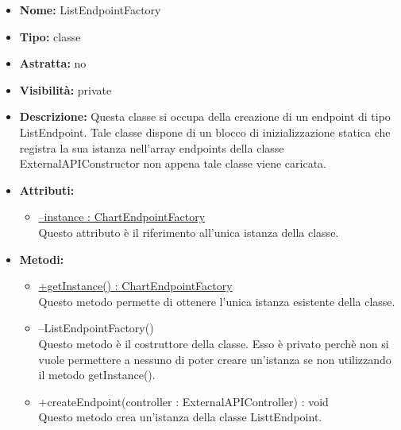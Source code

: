 			
			\begin{itemize}
			\item \textbf{Nome:} ListEndpointFactory
			\item \textbf{Tipo:} classe
			
		\item \textbf{Astratta:}
		no
			\item \textbf{Visibilità:} private
			\item \textbf{Descrizione:} Questa classe si occupa della creazione di un endpoint di tipo ListEndpoint. Tale classe dispone di un blocco di inizializzazione statica che registra la sua istanza nell'array endpoints della classe ExternalAPIConstructor non appena tale classe viene caricata.
			\item \textbf{Attributi:}
				\begin{itemize}
				\setlength{\itemsep}{5pt}
				
					\item[\ding{111}] \underline{--instance : ChartEndpointFactory} \\ [1mm] Questo attributo è il riferimento all'unica istanza della classe.
				\end{itemize}
		
			\item \textbf{Metodi:}
				\begin{itemize}
				\setlength{\itemsep}{5pt}
				
					\item[\ding{111}] {\underline{+getInstance() : ChartEndpointFactory}} \\ [1mm] Questo metodo permette di ottenere l'unica istanza esistente della classe.
					\item[\ding{111}] {{--ListEndpointFactory()}} \\ [1mm] Questo metodo è il costruttore della classe. Esso è privato perchè non si vuole permettere a nessuno di poter creare un’istanza se non utilizzando il metodo getInstance().

					\item[\ding{111}] {{+createEndpoint(controller : ExternalAPIController) : void}} \\ [1mm] Questo metodo crea un'istanza della classe ListtEndpoint.
				\end{itemize}
		
			\end{itemize}

			
